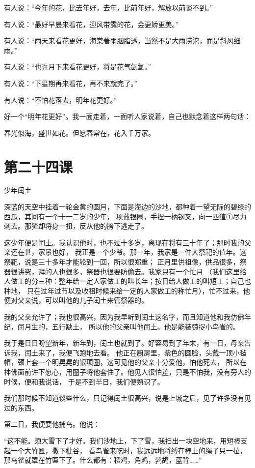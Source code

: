 \documentclass[12pt,UTF8]{ctexbook}
\begin{document}
有人说：“今年的花，比去年好，去年，比前年好，解放以前谈不到。”

有人说：“最好早晨来看花，迎风带露的花，会更娇更美。”

有人说：“雨天来看花更好，海棠著雨胭脂透，当然不是大雨涝沱，而是斜风细雨。”

有人说：“也许月下来看花更好，将是花气氤氲。”

有人说：“下星期再来看花，再不来就完了。”

有人说：“不怕花落去，明年花更好。”

好一个“明年花更好”。我一面走着，一面听人家说着，自己也默念着这样两句话：

春光似海，盛世如花。但愿春常在，花入千万家。

\section{第二十四课}

少年闰土

深蓝的天空中挂着一轮金黄的圆月，下面是海边的沙地，都种着一望无际的碧绿的西瓜，其间有一个十一二岁的少年，
项戴银圈，手捏一柄钢叉，向一匹猹①尽力刺去。那猹却将身一扭，反从他的胯下逃走了。

这少年便是闰土。我认识他时，也不过十多岁，离现在将有三十年了；那时我的父亲还在世，家景也好，
我正是一个少爷。那一年，我家是一件大祭祀的值年。这祭祀，说是三十多年才能轮到一回，所以很郑重；
正月里供祖像，供品很多，祭器很讲究，拜的人也很多，祭器也很要防偷去。我家只有一个忙月
（我们这里给人做工的分三种：整年给一定人家做工的叫长年；按日给人做工的叫短工；自己也种地，
只在过年过节以及收租时候来给一定的人家做工的称忙月），忙不过来，他便对父亲说，可以叫他的儿子闰土来管祭器的。

我的父亲允许了；我也很高兴，因为我早听到闰土这名字，而且知道他和我仿佛年纪，闰月生的，五行缺土，
所以他的父亲叫他闰土。他是能装弶捉小鸟雀的。

我于是日日盼望新年，新年到，闰土也就到了。好容易到了年末，有一日，母亲告诉我，闰土来了，我便飞跑地去看。
他正在厨房里，紫色的圆脸，头戴一顶小毡帽，颈上套一个明晃晃的银项圈，这可见他的父亲十分爱他，怕他死去，
所以在神佛面前许下愿心，用圈子将他套住了。他见人很怕羞，只是不怕我，没有旁人的时候，便和我说话，
于是不到半日，我们便熟识了。

我们那时候不知道谈些什么，只记得闰土很高兴，说是上城之后，见了许多没有见过的东西。

第二日，我便要他捕鸟。他说：

“这不能。须大雪下了才好。我们沙地上，下了雪，我扫出一块空地来，用短棒支起一个大竹匾，撒下秕谷，
看鸟雀来吃时，我远远地将缚在棒上的绳子只一拉，那鸟雀就罩在竹匾下了。什么都有：稻鸡，角鸡，鹁鸪，蓝背……”
\end{document}
